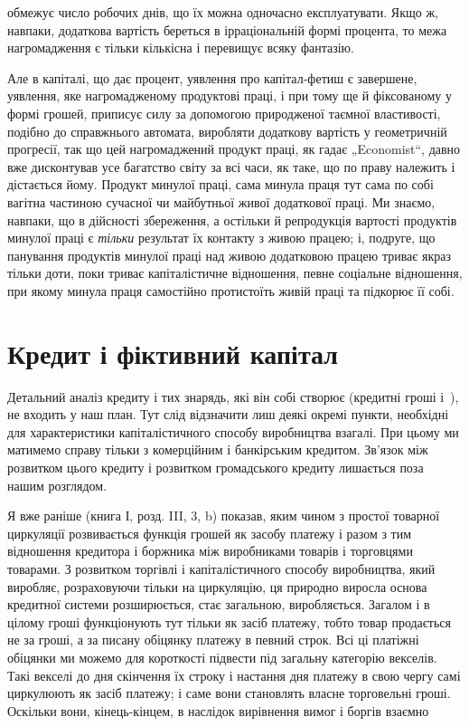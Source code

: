 \parcont{}  %
обмежує число робочих днів, що їх можна одночасно експлуатувати.
Якщо ж, навпаки, додаткова вартість береться в ірраціональній
формі процента, то межа нагромадження є тільки кількісна
і перевищує всяку фантазію.

Але в капіталі, що дає процент, уявлення про капітал-фетиш
є завершене, уявлення, яке нагромадженому продуктові праці,
і при тому ще й фіксованому у формі грошей, приписує силу за
допомогою природженої таємної властивості, подібно до справжнього
автомата, виробляти додаткову вартість у геометричній
прогресії, так що цей нагромаджений продукт праці, як гадає
„Economist“, давно вже дисконтував усе багатство світу за всі
часи, як таке, що по праву належить і дістається йому. Продукт
минулої праці, сама минула праця тут сама по собі вагітна частиною
сучасної чи майбутньої живої додаткової праці. Ми знаємо,
навпаки, що в дійсності збереження, а остільки й репродукція
вартості продуктів минулої праці є \emph{тільки} результат їх
контакту з живою працею; і, подруге, що панування продуктів
минулої праці над живою додатковою працею триває якраз тільки
доти, поки триває капіталістичне відношення, певне соціальне
відношення, при якому минула праця самостійно протистоїть
живій праці та підкорює її собі.

\section{Кредит і фіктивний капітал}

Детальний аналіз кредиту і тих знарядь, які він собі створює
(кредитні гроші і~), не входить у наш план. Тут слід відзначити
лиш деякі окремі пункти, необхідні для характеристики
капіталістичного способу виробництва взагалі. При цьому ми
матимемо справу тільки з комерційним і банкірським кредитом.
Зв’язок між розвитком цього кредиту і розвитком громадського
кредиту лишається поза нашим розглядом.

Я вже раніше (книга І, розд. III, 3, b) показав, яким чином
з простої товарної циркуляції розвивається функція грошей як
засобу платежу і разом з тим відношення кредитора і боржника
між виробниками товарів і торговцями товарами. З розвитком
торгівлі і капіталістичного способу виробництва, який
виробляє, розраховуючи тільки на циркуляцію, ця природно виросла
основа кредитної системи розширюється, стає загальною,
виробляється. Загалом і в цілому гроші функціонують тут тільки
як засіб платежу, тобто товар продається не за гроші, а за
писану обіцянку платежу в певний строк. Всі ці платіжні обіцянки
ми можемо для короткості підвести під загальну категорію
векселів. Такі векселі до дня скінчення їх строку і настання
дня платежу в свою чергу самі циркулюють як засіб платежу;
і саме вони становлять власне торговельні гроші. Оскільки вони,
кінець-кінцем, в наслідок вирівнення вимог і боргів взаємно
\parbreak{}  %
